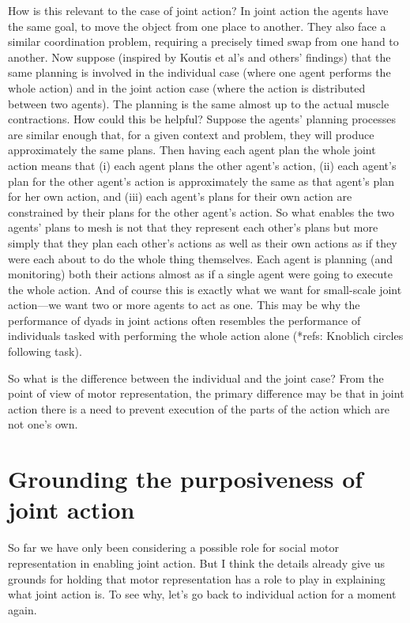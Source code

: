 \documentclass[12pt,\papersize]{extarticle}
\begin{document}
How is this relevant to the case of joint action?
In joint action the agents have the same goal, to move the object from one place to another.
They also face a similar coordination problem, requiring a precisely timed swap from one hand to another.
Now suppose (inspired by Koutis et al’s and others' findings) that the same planning is involved in the individual case (where one agent performs the whole action) and in the joint action case (where the action is distributed between two agents).
The planning is the same almost up to the actual muscle contractions.
How could this be helpful?
Suppose the agents' planning processes are similar enough that, for a given context and problem, they will produce approximately the same plans.
Then having each agent plan the whole joint action means that (i) each agent plans the other agent's action,
(ii) each agent's plan for the other agent's action is approximately the same as that agent's plan for her own action,
and 
(iii) each  agent's plans for their own action are constrained by their plans for the other agent's action.
So what enables the two agents' plans to mesh is not that they represent each other's plans but more simply that they plan each other's actions as well as their own actions as if they were each about to do the whole thing themselves.
Each agent is planning (and monitoring) both their actions almost as if a single agent were going to execute the whole action.
And of course this is exactly what we want for small-scale joint action---we want two or more agents to act as one.
This may be why the performance of dyads in joint actions often resembles the performance of individuals tasked with performing the whole action alone (*refs: Knoblich circles following task).

So what is the difference between the individual and the joint case?  From the point of view of motor representation, the primary difference may be that in joint action there is a need to prevent execution of the parts of the action which are not one’s own.



\section{Grounding the purposiveness of joint action}
So far we have only been considering a possible role for social motor representation in enabling joint action.  
But I think the details already give us grounds for holding that motor representation has a role to play in explaining what joint action is.
To see why,
let’s go back to individual action for a moment again.
\end{document}
